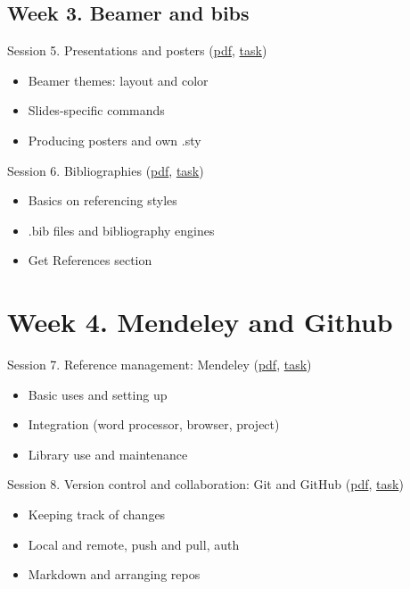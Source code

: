 \documentclass[a4paper,12pt]{article} %
\begin{document}
\subsection*{Week 3. Beamer and bibs}
	Session 5. Presentations and posters (\href{}{pdf}, \href{}{task})
	\begin{itemize}
		\item Beamer themes: layout and color
		\item Slides-specific commands
		\item Producing posters and own .sty 
	\end{itemize}

\newpage

	Session 6. Bibliographies (\href{}{pdf}, \href{}{task})
	\begin{itemize}
		\item Basics on referencing styles
		\item .bib files and bibliography engines
		\item Get References section
	\end{itemize}	

\section{{\color{red}Week 4. Mendeley and Github}}
	Session 7. Reference management: Mendeley (\href{}{pdf}, \href{}{task})
	\begin{itemize}
		\item Basic uses and setting up
		\item Integration (word processor, browser, project)
		\item Library use and maintenance 
	\end{itemize}%
	Session 8. Version control and collaboration: Git and GitHub (\href{}{pdf}, \href{}{task})
	\begin{itemize}
		\item Keeping track of changes
		\item Local and remote, push and pull, auth
		\item Markdown and arranging repos
	\end{itemize}
\end{document}
